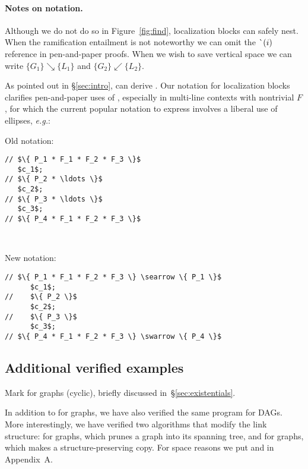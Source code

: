 \paragraph{Notes on notation.} 
{\color{magenta} Although we do not do so in Figure~\ref{fig:find}, localization blocks can safely nest.  When the ramification entailment is not noteworthy we can omit the $\lightning(i)$ reference in pen-and-paper proofs.  When we wish to save vertical space we can write $\{ G_1 \} \searrow \{ L_1 \}$ and $\{ G_2 \} \swarrow \{ L_2 \}$.

As pointed out in \S\ref{sec:intro},  can derive .  Our notation for localization blocks clarifies pen-and-paper uses of , especially in multi-line contexts with nontrivial $F$, for which the current popular notation to express  involves a liberal use of 
ellipses, \emph{e.g.}:

\vspace{5pt}

\begin{minipage}{.25\textwidth}
Old notation:
\begin{lstlisting}
// $\{ P_1 * F_1 * F_2 * F_3 \}$
   $c_1$;
// $\{ P_2 * \ldots \}$
   $c_2$;
// $\{ P_3 * \ldots \}$
   $c_3$;
// $\{ P_4 * F_1 * F_2 * F_3 \}$
\end{lstlisting}
\end{minipage} \quad \vline \; ~~~
\begin{minipage}{.3\textwidth}
New notation:
\begin{lstlisting}[numbers=none]
// $\{ P_1 * F_1 * F_2 * F_3 \} \searrow \{ P_1 \}$
      $c_1$;
//    $\{ P_2 \}$
      $c_2$;
//    $\{ P_3 \}$
      $c_3$;
// $\{ P_4 * F_1 * F_2 * F_3 \} \swarrow \{ P_4 \}$
\end{lstlisting}
\end{minipage}
\vspace{-0.75ex}
}

\subsection{\color{magenta}Additional verified examples}
\label{sec:application}

Mark for graphs (cyclic), briefly discussed in~\S\ref{sec:existentials}.

In addition to  for graphs, we have also verified the same program for DAGs.
More interestingly, we have verified two algorithms that modify the link structure:
 for graphs, which prunes a graph into its spanning tree, and 
for graphs, which makes a structure-preserving copy.  For space reasons we put
 and  in Appendix~A\hide{\ref{apx:spanning}}.


